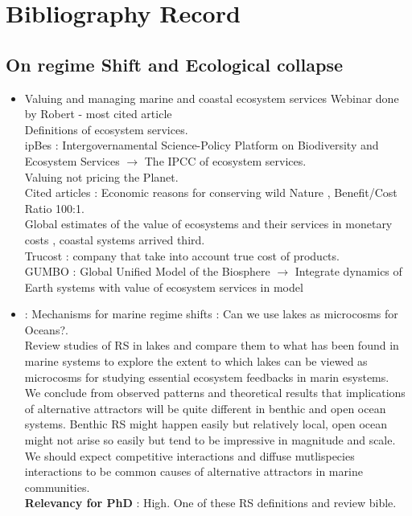\documentclass[]{report}
\begin{document}
	
	\tableofcontents
	
	\chapter{Bibliography Record}
	\section{On regime Shift and Ecological collapse}
	\begin{itemize}
		\subsection{Theory and Generalities on Regime Shift and resilience}
		
		\item Valuing and managing marine and coastal ecosystem services Webinar done by Robert  - most cited article \cite{costanza1997value}
		\\ Definitions of ecosystem services.
		\\ ipBes : Intergovernamental Science-Policy Platform on Biodiversity and Ecosystem Services $\rightarrow$ The IPCC of ecosystem services.
		\\ Valuing not pricing the Planet.
		\\ Cited articles : Economic reasons for conserving wild Nature \cite{balmford2002economic}, Benefit/Cost Ratio 100:1.
		\\Global estimates of the value of ecosystems and their services in monetary costs \cite{de2012global}, coastal systems arrived third.
		\\ Trucost : company that take into account true cost of products.
		\\GUMBO : Global Unified Model of the Biosphere $\rightarrow$ Integrate dynamics of Earth systems with value of ecosystem services in model
		\item \cite{scheffer2004mechanisms} : Mechanisms for marine regime shifts : Can we use lakes as microcosms for Oceans?.
		\\ Review studies of RS in lakes and compare them to what has been found in marine systems to explore the extent to which lakes can be viewed as microcosms for studying essential ecosystem feedbacks in marin esystems.
		\\We conclude from observed patterns and theoretical results that implications of alternative attractors will be quite different in benthic and open ocean systems. Benthic RS might happen easily but relatively local, open ocean might not arise so easily but tend to be impressive in magnitude and scale.
		\\ We should expect competitive interactions and diffuse mutlispecies interactions to be common causes of alternative attractors in marine communities.
		\\\textbf{Relevancy for PhD} : High. One of these RS definitions and review bible.
		

\end{itemize}
\end{document}
